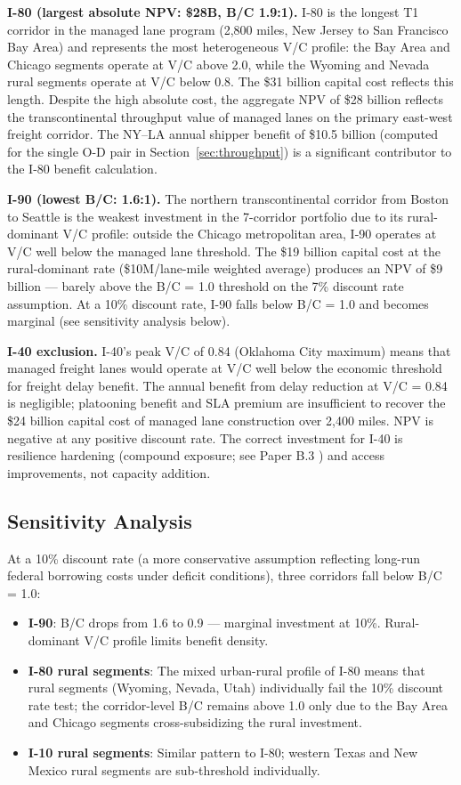 \textbf{I-80 (largest absolute NPV: \$28B, B/C 1.9:1).} I-80 is the longest T1 corridor in the managed lane program (2,800 miles, New Jersey to San Francisco Bay Area) and represents the most heterogeneous V/C profile: the Bay Area and Chicago segments operate at V/C above 2.0, while the Wyoming and Nevada rural segments operate at V/C below 0.8. The \$31 billion capital cost reflects this length. Despite the high absolute cost, the aggregate NPV of \$28 billion reflects the transcontinental throughput value of managed lanes on the primary east-west freight corridor. The NY--LA annual shipper benefit of \$10.5 billion \citep{ATRI_costs2024} (computed for the single O-D pair in Section~\ref{sec:throughput}) is a significant contributor to the I-80 benefit calculation.

\textbf{I-90 (lowest B/C: 1.6:1).} The northern transcontinental corridor from Boston to Seattle is the weakest investment in the 7-corridor portfolio due to its rural-dominant V/C profile: outside the Chicago metropolitan area, I-90 operates at V/C well below the managed lane threshold. The \$19 billion capital cost at the rural-dominant rate (\$10M/lane-mile weighted average) produces an NPV of \$9 billion --- barely above the B/C = 1.0 threshold on the 7\% discount rate assumption. At a 10\% discount rate, I-90 falls below B/C = 1.0 and becomes marginal (see sensitivity analysis below).

\textbf{I-40 exclusion.} I-40's peak V/C of 0.84 (Oklahoma City maximum) means that managed freight lanes would operate at V/C well below the economic threshold for freight delay benefit. The annual benefit from delay reduction at V/C = 0.84 is negligible; platooning benefit and SLA premium are insufficient to recover the \$24 billion capital cost of managed lane construction over 2,400 miles. NPV is negative at any positive discount rate. The correct investment for I-40 is resilience hardening (compound exposure; see Paper B.3 \citep{ROUTE_B3}) and access improvements, not capacity addition.

\subsection{Sensitivity Analysis}

At a 10\% discount rate (a more conservative assumption reflecting long-run federal borrowing costs under deficit conditions), three corridors fall below B/C = 1.0:

\begin{itemize}
\item \textbf{I-90}: B/C drops from 1.6 to 0.9 --- marginal investment at 10\%. Rural-dominant V/C profile limits benefit density.
\item \textbf{I-80 rural segments}: The mixed urban-rural profile of I-80 means that rural segments (Wyoming, Nevada, Utah) individually fail the 10\% discount rate test; the corridor-level B/C remains above 1.0 only due to the Bay Area and Chicago segments cross-subsidizing the rural investment.
\item \textbf{I-10 rural segments}: Similar pattern to I-80; western Texas and New Mexico rural segments are sub-threshold individually.
\end{itemize}

